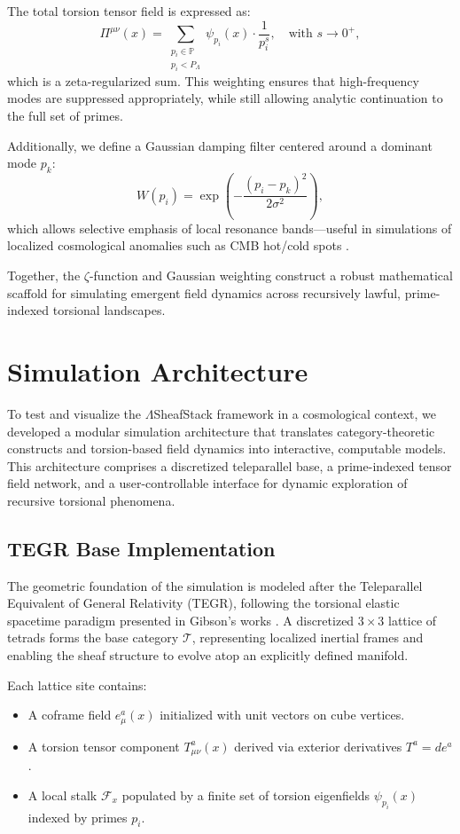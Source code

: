 \documentclass{article}
\theoremstyle{plain}
\begin{document}
The total torsion tensor field is expressed as:
\[
\Pi^{\mu\nu}(x) = \sum_{\substack{p_i \in \mathbb{P} \\ p_i < P_\Lambda}} \psi_{p_i}(x) \cdot \frac{1}{p_i^s}, \quad \text{with } s \to 0^+,
\]
which is a zeta-regularized sum. This weighting ensures that high-frequency modes are suppressed appropriately, while still allowing analytic continuation to the full set of primes.

Additionally, we define a Gaussian damping filter centered around a dominant mode $p_k$:
\[
W(p_i) = \exp\left( -\frac{(p_i - p_k)^2}{2\sigma^2} \right),
\]
which allows selective emphasis of local resonance bands—useful in simulations of localized cosmological anomalies such as CMB hot/cold spots \cite{vanGelder2025PIRTM}.

Together, the $\zeta$-function and Gaussian weighting construct a robust mathematical scaffold for simulating emergent field dynamics across recursively lawful, prime-indexed torsional landscapes.

\section{Simulation Architecture}

To test and visualize the $\Lambda$SheafStack framework in a cosmological context, we developed a modular simulation architecture that translates category-theoretic constructs and torsion-based field dynamics into interactive, computable models. This architecture comprises a discretized teleparallel base, a prime-indexed tensor field network, and a user-controllable interface for dynamic exploration of recursive torsional phenomena.

\subsection{TEGR Base Implementation}

The geometric foundation of the simulation is modeled after the Teleparallel Equivalent of General Relativity (TEGR), following the torsional elastic spacetime paradigm presented in Gibson's works \cite{gibson2025field,gibson2025overview}. A discretized $3\times3$ lattice of tetrads forms the base category $\mathcal{T}$, representing localized inertial frames and enabling the sheaf structure to evolve atop an explicitly defined manifold.

Each lattice site contains:

\begin{itemize}
  \item A coframe field $e^a_\mu(x)$ initialized with unit vectors on cube vertices.
  \item A torsion tensor component $T^a_{\mu\nu}(x)$ derived via exterior derivatives $T^a = de^a$.
  \item A local stalk $\mathcal{F}_x$ populated by a finite set of torsion eigenfields $\psi_{p_i}(x)$ indexed by primes $p_i$.
\end{itemize}
\end{document}
